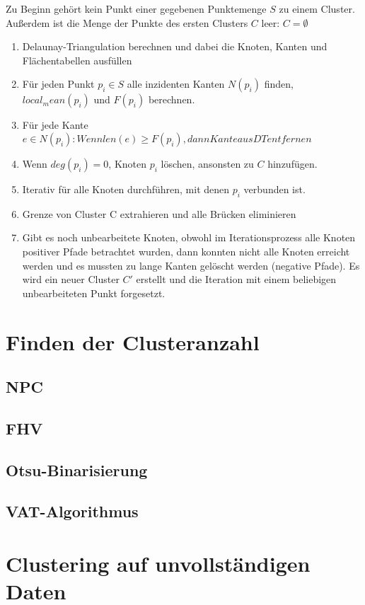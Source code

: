 \documentclass[11pt,ceqn]{book}
\begin{document}
Zu Beginn gehört kein Punkt einer gegebenen Punktemenge $S$ zu einem Cluster. Außerdem ist die Menge der Punkte des ersten Clusters $C$ leer: $C=\emptyset$
\begin{enumerate}
\item Delaunay-Triangulation berechnen und dabei die Knoten, Kanten und Flächentabellen ausfüllen
\item Für jeden Punkt $p_i \in S$ alle inzidenten Kanten $N(p_i)$ finden, $local_mean(p_i)$ und $F(p_i)$ berechnen.
\item Für jede Kante $e \in N(p_i): Wenn len(e) \geqslant F(p_i), dann Kante aus DT entfernen$
\item Wenn $deg(p_i)=0$, Knoten $p_i$ löschen, ansonsten zu $C$ hinzufügen.
\item Iterativ für alle Knoten durchführen, mit denen $p_i$ verbunden ist.
\item Grenze von Cluster C extrahieren und alle Brücken eliminieren
\item Gibt es noch unbearbeitete Knoten, obwohl im Iterationsprozess alle Knoten positiver Pfade betrachtet wurden, dann konnten nicht alle Knoten erreicht werden und es mussten zu lange Kanten gelöscht werden (negative Pfade). Es wird ein neuer Cluster $C'$ erstellt und die Iteration mit einem beliebigen unbearbeiteten Punkt forgesetzt.
\end{enumerate}
\section{Finden der Clusteranzahl}
\subsection{NPC}
\subsection{FHV}
\subsection{Otsu-Binarisierung}
\subsection{VAT-Algorithmus}


\section{Clustering auf unvollständigen Daten}
\end{document}
